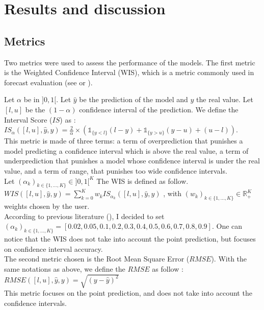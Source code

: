 \section{Results and discussion}


\subsection*{Metrics}
\label{sec:metrics}
Two metrics were used to assess the performance of the models. 
The first metric is the Weighted Confidence Interval (WIS), which is a metric commonly used in forecast evaluation (see \cite{cramer2022evaluation} or \cite{paireau2022ensemble}). 

Let $\alpha$ be in $]0, 1[$. Let $\hat{y}$ be the prediction of the model and $y$ the real value.
Let $[l, u]$ be the $(1-\alpha)$ confidence interval of the prediction.
We define the Interval Score ($IS$) as : \\
$IS_\alpha( [l, u], \hat{y}, y ) = \frac{2}{\alpha} \times ( \mathbb{1}_{\{y<l\}} (l-y) + \mathbb{1}_{\{y>u\}} (y-u) + (u-l))$. \\
This metric is made of three terms: a term of overprediction that punishes a model predicting a confidence interval which is above the real value, a term of underprediction that punishes a model whose confidence interval is under the real value, and a term of range, that punishes too wide confidence intervals. \\
Let $(\alpha_k)_{k \in \{1, \dots , K\}} \in ] 0 , 1 [ ^K $
The WIS is defined as follow. \\

$WIS( [l, u], \hat{y}, y ) = \sum_{k=0}^{K} w_k IS_{\alpha_k}( [l, u], \hat{y}, y ) $ , with $(w_k)_{k \in \{1, ... , K\}} \in \mathbb{R}_+ ^K $ weights chosen by the user. \\

According to previous literature (\cite{cramer2022evaluation}), I decided to set \\
$(\alpha_k)_{k \in \{1, ... , K\}} = [0.02, 0.05, 0.1, 0.2, 0.3, 0.4, 0.5, 0.6, 0.7, 0.8, 0.9]$. 
One can notice that the WIS does not take into account the point prediction, but focuses on confidence interval accuracy. \\

The second metric chosen is the Root Mean Square Error ($RMSE$). 
With the same notations as above, we define the $RMSE$ as follow : \\
$RMSE([l, u], \hat{y}, y) = \sqrt{(y-\hat{y})^2}$\\
This metric focuses on the point prediction, and does not take into account the confidence intervals. 


